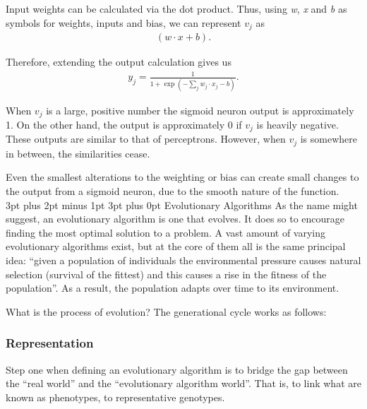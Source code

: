 \documentclass[12pt,a4paper]{article}
\makeatletter
\renewcommand\subsection{\@startsection {subsection}{1}{2mm} %
                               {3pt plus 2pt minus 1pt} %
                               {3pt plus 0pt} %
                               {\normalfont\bfseries}}
\makeatother
\begin{document}
Input weights can be calculated via the dot product. Thus, using \textit{w}, \textit{x} and \textit{b} as symbols for weights, inputs and bias, we can represent $v_j$ as 
\begin{eqnarray}
(w \cdot x+b).
\end{eqnarray}

\begin{center}
	\citep{NeuralNetworksAndDeepLearning}
\end{center}

Therefore, extending the output calculation gives us
\begin{eqnarray} 
y_j = \frac{1}{1+\exp(-\sum_j w_j \cdot x_j - b)}.
\end{eqnarray}


When $v_j$ is a large, positive number the sigmoid neuron output is approximately 1. On the other hand, the output is approximately 0 if $v_j$ is heavily negative. These outputs are similar to that of perceptrons. However, when $v_j$ is somewhere in between, the similarities cease. 

Even the smallest alterations to the weighting or bias can create small changes to the output from a sigmoid neuron, due to the smooth nature of the function\citep{NeuralNetworksAndDeepLearning}.\\

\subsection{Evolutionary Algorithms}
As the name might suggest, an evolutionary algorithm is one that evolves. It does so to encourage finding the most optimal solution to a problem. A vast amount of varying evolutionary algorithms exist, but at the core of them all is the same principal idea: \enquote{given a population of individuals the environmental pressure causes natural selection (survival of the fittest) and this causes a rise in the fitness of the population}\citep{IntroductionToEvolutionaryComputing}. As a result, the population adapts over time to its environment. 

What is the process of evolution? The generational cycle works as follows:

\subsubsection{Representation}
Step one when defining an evolutionary algorithm is to bridge the gap between the \enquote{real world} and the \enquote{evolutionary algorithm world}\citep{IntroductionToEvolutionaryComputing}. That is, to link what are known as phenotypes, to representative genotypes. 
\end{document}
